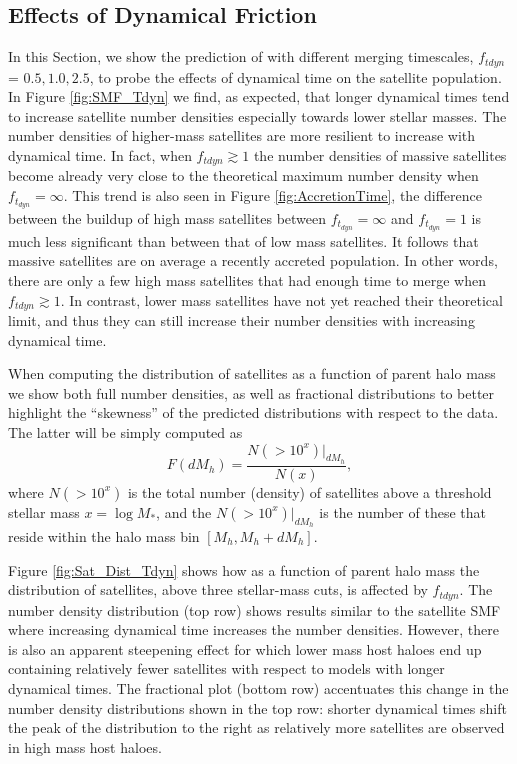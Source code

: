 \subsection{Effects of Dynamical Friction}
In this Section, we show the prediction of \steel with different merging timescales, $f_{tdyn}$ = $0.5, 1.0, 2.5$, to probe the effects of dynamical time on the satellite population. In Figure \ref{fig:SMF_Tdyn} we find, as expected, that longer dynamical times tend to increase satellite number densities especially towards lower stellar masses. The number densities of higher-mass satellites are more resilient to increase with dynamical time. In fact, when $f_{tdyn}\gtrsim 1$ the number densities of massive satellites become already very close to the theoretical maximum number density when  $f_{t_{dyn}} = \infty$. This trend is also seen in Figure \ref{fig:AccretionTime}, the difference between the buildup of high mass satellites between $f_{t_{dyn}} = \infty$ and $f_{t_{dyn}} = 1$ is much less significant than between that of low mass satellites.
It follows that massive satellites are on average a recently accreted population. In other words, there are only a few high mass satellites that had enough time to merge when $f_{tdyn}\gtrsim 1$. In contrast, lower mass satellites have not yet reached their theoretical limit, and thus they can still increase their number densities with increasing dynamical time.  

When computing the distribution of satellites as a function of parent halo mass we show both full number densities, as well as fractional distributions to better highlight the ``skewness'' of the predicted distributions with respect to the data. The latter will be simply computed as
\begin{equation}
\label{eqn:FracPlot}
F(dM_h) = \frac{N(>10^x)|_{dM_h}}{N(x)},
\end{equation} 
where $N(>10^{x})$ is the total number (density) of satellites above a threshold stellar mass $x= \log M_{*}$, and the $N(>10^{x})|_{dM_h}$ is the number of these that reside within the halo mass bin $[M_h, M_h+dM_h]$.

Figure \ref{fig:Sat_Dist_Tdyn} shows how as a function of parent halo mass the distribution of satellites, above three stellar-mass cuts, is affected by $f_{tdyn}$. The number density distribution (top row) shows results similar to the satellite SMF where increasing dynamical time increases the number densities. However, there is also an apparent steepening effect for which lower mass host haloes end up containing relatively fewer satellites with respect to models with longer dynamical times. The fractional plot (bottom row) accentuates this change in the number density distributions shown in the top row: shorter dynamical times shift the peak of the distribution to the right as relatively more satellites are observed in high mass host haloes.

